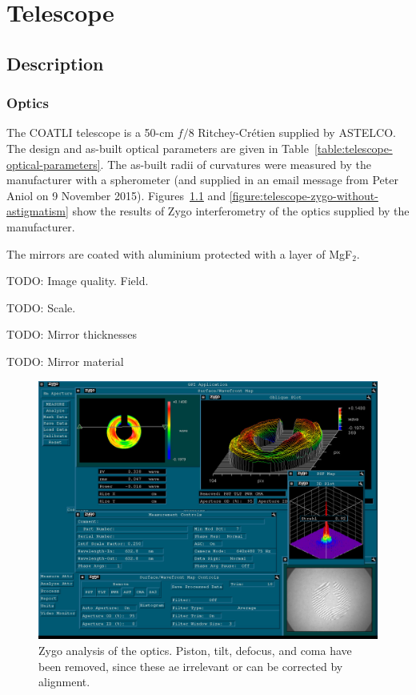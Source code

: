 \chapter{Telescope}
\label{chapter:telescope}

\section{Description}


\subsection{Optics}

The COATLI telescope is a 50-cm $f/8$ Ritchey-Crétien supplied by ASTELCO. The design and as-built optical parameters are given in Table~\ref{table:telescope-optical-parameters}. The as-built radii of curvatures were measured by the manufacturer with a spherometer (and supplied in an email message from Peter Aniol on 9 November 2015). Figures~\ref{figure:telescope-zygo-with-astigmatism} and \ref{figure:telescope-zygo-without-astigmatism} show the results of Zygo interferometry of the optics supplied by the manufacturer. 

The mirrors are coated with aluminium protected with a layer of MgF$_2$.

TODO: Image quality. Field.

TODO: Scale.

TODO: Mirror thicknesses

TODO: Mirror material

\begin{figure}
\begin{center}
\includegraphics[width=1.0\linewidth]{figures/telescope-zygo-with-astigmatism.jpg}
\end{center}
\caption{Zygo analysis of the optics. Piston, tilt, defocus, and coma have been removed, since these ae irrelevant or can be corrected by alignment.}
\label{figure:telescope-zygo-with-astigmatism}
\end{figure}

